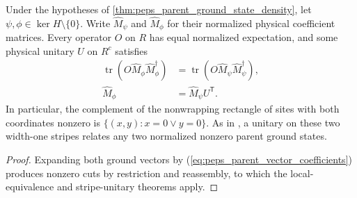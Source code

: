 \begin{lemma}%
    \label{thm:peps_parent_ground_state_local_equivalence}
    \leanok
    Under the hypotheses of \ref{thm:peps_parent_ground_state_density},
    let $\psi,\phi\in\ker H\setminus\{0\}$. Write $\widehat M_\psi$
    and $\widehat M_\phi$ for their normalized physical coefficient
    matrices. Every operator $O$ on $R$ has equal normalized expectation,
    and some physical unitary $U$ on $R^c$ satisfies
    \begin{align}
        \operatorname{tr}(O\widehat M_\phi\widehat M_\phi^\dagger)
                        & =\operatorname{tr}(O\widehat M_\psi\widehat M_\psi^\dagger), \\
        \widehat M_\phi & =\widehat M_\psi U^{\mathsf T}.
    \end{align}
    In particular, the complement of the nonwrapping rectangle of sites
    with both coordinates nonzero is $\{(x,y):x=0\lor y=0\}$.
    As in \cite[Theorem~6.7 and Corollary~6.8]{Schuch2010PEPS}, a unitary on these two width-one stripes relates any two normalized
    nonzero parent ground states.
\end{lemma}
\begin{proof}\leanok
    Expanding both ground vectors by
    (\ref{eq:peps_parent_vector_coefficients}) produces nonzero cuts
    by restriction and reassembly, to which the local-equivalence and
    stripe-unitary theorems apply.
\end{proof}

